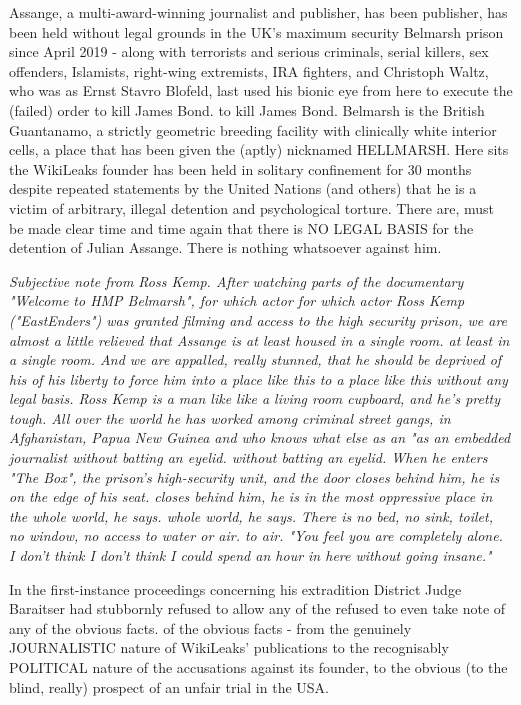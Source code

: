\begin{multicols}{2}
Assange, a multi-award-winning journalist and publisher, has been
publisher, has been held without legal grounds in the UK's maximum security Belmarsh prison since April 2019
- along with terrorists and serious criminals,
serial killers, sex offenders, Islamists, right-wing extremists, IRA fighters, and Christoph Waltz, who was
as Ernst Stavro Blofeld, last used his bionic eye from here to execute the (failed) order to kill James Bond.
to kill James Bond. Belmarsh is the
British Guantanamo, a strictly geometric breeding facility with clinically white interior cells, a place that has been given the
(aptly) nicknamed HELLMARSH. Here sits
the WikiLeaks founder has been held in solitary confinement for 30 months despite repeated statements by the United Nations
(and others) that he is a victim of arbitrary, illegal detention and psychological torture. There are,
must be made clear time and time again that there is NO
LEGAL BASIS for the detention of Julian
Assange. There is nothing whatsoever
against him.

\textit{Subjective note from Ross Kemp.
After watching parts of the documentary "Welcome to
HMP Belmarsh", for which actor
for which actor Ross Kemp ("EastEnders") was granted filming
and access to the high security prison, we are almost a little relieved that Assange is at least housed in a single room.
at least in a single room.
And we are appalled, really stunned, that he should be deprived of his
of his liberty to force him into a place like this
to a place like this without any legal basis. Ross Kemp is a man like
like a living room cupboard, and he's pretty tough.
All over the world he has worked among criminal street gangs, in
Afghanistan, Papua New Guinea and who knows what else as an
"as an embedded journalist without batting an eyelid.
without batting an eyelid. When he enters "The Box", the prison's high-security unit, and the door closes behind him, he is on the edge of his seat.
closes behind him, he is in the most oppressive place in the whole world, he says.
whole world, he says. There is no bed, no sink,
toilet, no window, no access to water or air.
to air. "You feel you are completely alone. I don't think
I don't think I could spend an hour in here
without going insane."}

In the first-instance proceedings concerning his extradition
District Judge Baraitser had stubbornly refused to allow any of the
refused to even take note of any of the obvious facts.
of the obvious facts - from the genuinely JOURNALISTIC nature of WikiLeaks' publications
to the recognisably POLITICAL nature of the accusations against its
founder, to the obvious (to the blind, really) prospect of an unfair trial in the USA.


\end{multicols}
